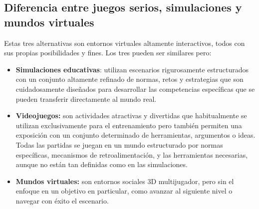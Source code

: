 \subsection{Diferencia entre juegos serios, simulaciones y mundos virtuales}


Estas tres alternativas son entornos virtuales altamente interactivos, todos con
sus propias posibilidades y fines. Los tres pueden ser similares
pero\cite{education:games}:

\begin{itemize}
\item \textbf{Simulaciones educativas}: utilizan escenarios rigurosamente
    estructurados con un conjunto altamente refinado de normas, retos y
    estrategias que son cuidadosamente diseñados para desarrollar las
    competencias específicas que se pueden transferir directamente al mundo
    real.
\item \textbf{Videojuegos:} son actividades atractivas y divertidas que
    habitualmente se utilizan exclusivamente para el entrenamiento pero también
    permiten una exposición con un conjunto determinado de herramientas,
    argumentos o ideas. Todas las partidas se juegan en un mundo estructurado
    por normas específicas, mecanismos de retroalimentación, y las herramientas
    necesarias, aunque no están tan definidas como en las simulaciones.
\item \textbf{Mundos virtuales:} son entornos sociales 3D multijugador, pero sin
    el enfoque en un objetivo en particular, como avanzar al siguiente nivel o
    navegar con éxito el escenario.
\end{itemize}
